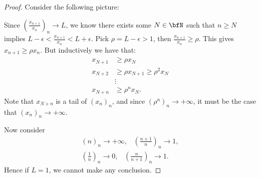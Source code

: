 \documentclass[10pt,twoside,openany]{memoir}
\begin{document}
        \begin{proof}
            Consider the following picture:
                \begin{center}
                \end{center}
            Since $\left(\frac{x_{n+1}}{x_n}\right)_n \rightarrow L$, we know there exists some $N \in \bfN$ such that $n \geq N$ implies $L - \epsilon < \frac{x_{n+1}}{x_n} < L + \epsilon$. Pick $\rho = L - \epsilon > 1$, then $\frac{x_{n+1}}{x_n} \geq \rho$. This gives $x_{n+1} \geq \rho x_n$. But inductively we have that:
                \begin{equation*}
                \begin{split}
                    x_{N+1} &\geq \rho x_{N} \\
                    x_{N+2} &\geq \rho x_{N+1} \geq \rho^2 x_{N} \\
                    &\vdots \\
                    x_{N+n} &\geq \rho^n x_N.
                \end{split}
                \end{equation*}
            Note that $x_{N+n}$ is a tail of $(x_n)_n$, and since $(\rho^n)_n \rightarrow +\infty$, it must be the case that $(x_n)_n \rightarrow +\infty$.

            Now consider
                \begin{equation*}
                \begin{split}
                    (n)_n \rightarrow +\infty, \hspace{10pt} \left(\frac{n+1}{n}\right)_n \rightarrow 1,\\
                    \left(\frac{1}{n}\right)_n \rightarrow 0, \hspace{10pt} \left(\frac{n}{n+1}\right)_n \rightarrow 1. 
                \end{split}
                \end{equation*}
            Hence if $L = 1$, we cannot make any conclusion.
        \end{proof}
\end{document}
